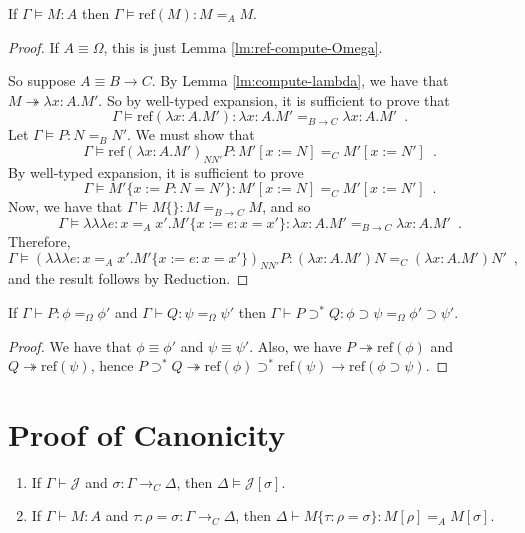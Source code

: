 \documentclass[a4paper,UKenglish]{lipics-v2016}
\newcommand*{\reff}[1]{\ensuremath{\mathrm{ref} \left( {#1} \right)}}
\newcommand*{\triplelambda}{\ensuremath{\lambda \!\! \lambda \!\! \lambda}}
\theoremstyle{plain}
\begin{document}
\begin{lemma}
\label{lm:ref-compute}
If $\Gamma \models M : A$ then $\Gamma \models \reff{M} : M =_A M$.
\end{lemma}

\begin{proof}
If $A \equiv \Omega$, this is just Lemma \ref{lm:ref-compute-Omega}.

So suppose $A \equiv B \rightarrow C$.  By Lemma \ref{lm:compute-lambda}, we have that $M \twoheadrightarrow \lambda x:A.M'$.  So by well-typed expansion, it is sufficient to prove that
\[ \Gamma \models \reff{\lambda x:A.M'} : \lambda x:A.M' =_{B \rightarrow C} \lambda x:A.M' \enspace . \]
Let $\Gamma \models P : N =_B N'$.  We must show that
\[ \Gamma \models \reff{\lambda x:A.M'}_{N N'} P : M' [x:= N] =_C M' [x:=N'] \enspace . \]
By well-typed expansion, it is sufficient to prove
\[ \Gamma \models M' \{ x:= P : N = N' \} : M' [x:=N] =_C M' [x:= N'] \enspace . \]
Now, we have that $\Gamma \models M \{\} : M =_{B \rightarrow C} M$, and so
\[ \Gamma \models \triplelambda e : x =_A x' . M' \{ x := e : x = x' \} : \lambda x:A.M' =_{B \rightarrow C} \lambda x:A.M' \enspace . \]
Therefore,
\[ \Gamma \models (\triplelambda e : x=_A x' . M' \{ x := e : x = x' \})_{N N'} P : (\lambda x:A.M') N =_C (\lambda x:A.M') N' \enspace , \]
and the result follows by Reduction.
\end{proof}

\begin{lemma}
\label{lm:compute-supset*}
If $\Gamma \vdash P : \phi =_\Omega \phi'$ and $\Gamma \vdash Q : \psi =_\Omega \psi'$ then $\Gamma \vdash P \supset^* Q : \phi \supset \psi =_\Omega \phi' \supset \psi'$.
\end{lemma}

\begin{proof}
We have that $\phi \equiv \phi'$ and $\psi \equiv \psi'$.  Also, we have $P \twoheadrightarrow \reff{\phi}$ and $Q \twoheadrightarrow \reff{\psi}$, hence
$P \supset^* Q \twoheadrightarrow \reff{\phi} \supset^* \reff{\psi} \rightarrow \reff{\phi \supset \psi}$.
\end{proof}

\section{Proof of Canonicity}

\begin{theorem}
\begin{enumerate}
\item
If $\Gamma \vdash \mathcal{J}$ and $\sigma : \Gamma \rightarrow_C \Delta$, then $\Delta \models \mathcal{J} [ \sigma ]$.
\item
If $\Gamma \vdash M : A$ and $\tau : \rho = \sigma : \Gamma \rightarrow_C \Delta$, then $\Delta \vdash M \{ \tau : \rho = \sigma \} : M [ \rho ] =_A M [ \sigma ]$.
\end{enumerate}
\end{theorem}
\end{document}
